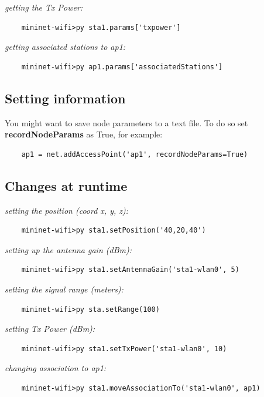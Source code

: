 \noindent \textit{getting the Tx Power:}
\begin{verbatim}
    mininet-wifi>py sta1.params['txpower']
\end{verbatim}

\noindent \textit{getting associated stations to ap1:}
\begin{verbatim}
    mininet-wifi>py ap1.params['associatedStations']
\end{verbatim}

\subsection{Setting information}

You might want to save node parameters to a text file. To do so set \textbf{recordNodeParams} as True, for example:
\begin{verbatim}
    ap1 = net.addAccessPoint('ap1', recordNodeParams=True)
\end{verbatim}

\subsection{Changes at runtime}

\noindent \textit{setting the position (coord x, y, z):}
\begin{verbatim}
    mininet-wifi>py sta1.setPosition('40,20,40')
\end{verbatim}

\noindent \textit{setting up the antenna gain (dBm):}
\begin{verbatim}
    mininet-wifi>py sta1.setAntennaGain('sta1-wlan0', 5)
\end{verbatim}

\noindent \textit{setting the signal range (meters):}
\begin{verbatim}
    mininet-wifi>py sta.setRange(100)
\end{verbatim}

\noindent \textit{setting Tx Power (dBm):}
\begin{verbatim}
    mininet-wifi>py sta1.setTxPower('sta1-wlan0', 10)
\end{verbatim}

\noindent \textit{changing association to ap1:}
\begin{verbatim}
    mininet-wifi>py sta1.moveAssociationTo('sta1-wlan0', ap1)
\end{verbatim}

